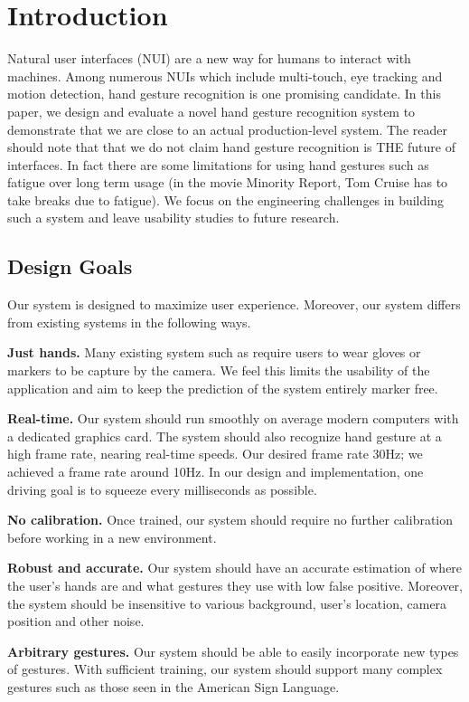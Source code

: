 \section{Introduction}
\label{sec: intro}

Natural user interfaces (NUI) are a new way for humans to interact with machines. Among numerous NUIs which include multi-touch, eye tracking and motion detection, hand gesture recognition is one promising candidate. In this paper, we design and evaluate a novel hand gesture recognition system to demonstrate that we are close to an actual production-level system. The reader should note that that we do not claim hand gesture recognition is THE future of interfaces. In fact there are some limitations for using hand gestures such as fatigue over long term usage (in the movie Minority Report, Tom Cruise has to take breaks due to fatigue). We focus on the engineering challenges in building such a system and leave usability studies to future research.

\subsection{Design Goals}
Our system is designed to maximize user experience. Moreover, our system differs from existing systems in the following ways.

\textbf{Just hands.} Many existing system such as \cite{mistry, wang2009} require users to wear gloves or markers to be capture by the camera. We feel this limits the usability of the application and aim to keep the prediction of the system entirely marker free.
  
\textbf{Real-time.} Our system should run smoothly on average modern computers with a dedicated graphics card. The system should also recognize hand gesture at a high frame rate, nearing real-time speeds. Our desired frame rate 30Hz; we achieved a frame rate around 10Hz. In our design and implementation, one driving goal is to squeeze every milliseconds as possible. 

\textbf{No calibration.}  Once trained, our system should require no further calibration before working in a new environment. 

\textbf{Robust and accurate.} Our system should have an accurate estimation of where the user's hands are and what gestures they use with low false positive. Moreover, the system should be insensitive to various background, user's location, camera position and other noise. 

\textbf{Arbitrary gestures.} Our system should be able to easily incorporate new types of gestures. With sufficient training, our system should support many complex gestures such as those seen in the American Sign Language.

